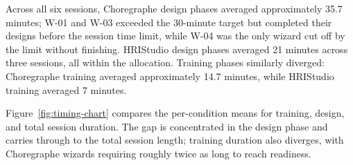 Across all six sessions, Choregraphe design phases averaged approximately 35.7 minutes; W-01 and W-03 exceeded the 30-minute target but completed their designs before the session time limit, while W-04 was the only wizard cut off by the limit without finishing. HRIStudio design phases averaged 21 minutes across three sessions, all within the allocation. Training phases similarly diverged: Choregraphe training averaged approximately 14.7 minutes, while HRIStudio training averaged 7 minutes.

Figure~\ref{fig:timing-chart} compares the per-condition means for training, design, and total session duration. The gap is concentrated in the design phase and carries through to the total session length; training duration also diverges, with Choregraphe wizards requiring roughly twice as long to reach readiness.

